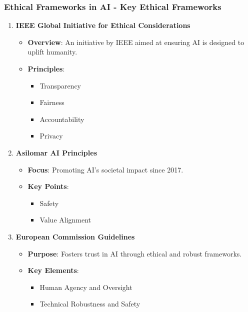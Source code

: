 \documentclass[aspectratio=169]{beamer}
\begin{document}
\begin{frame}[fragile]
    \frametitle{Ethical Frameworks in AI - Key Ethical Frameworks}
    \begin{enumerate}
        \item \textbf{IEEE Global Initiative for Ethical Considerations}
            \begin{itemize}
                \item \textbf{Overview}: An initiative by IEEE aimed at ensuring AI is designed to uplift humanity.
                \item \textbf{Principles}:
                    \begin{itemize}
                        \item Transparency
                        \item Fairness
                        \item Accountability
                        \item Privacy
                    \end{itemize}
            \end{itemize}
        
        \item \textbf{Asilomar AI Principles}
            \begin{itemize}
                \item \textbf{Focus}: Promoting AI's societal impact since 2017.
                \item \textbf{Key Points}:
                    \begin{itemize}
                        \item Safety
                        \item Value Alignment
                    \end{itemize}
            \end{itemize}
        
        \item \textbf{European Commission Guidelines}
            \begin{itemize}
                \item \textbf{Purpose}: Fosters trust in AI through ethical and robust frameworks.
                \item \textbf{Key Elements}:
                    \begin{itemize}
                        \item Human Agency and Oversight
                        \item Technical Robustness and Safety
                    \end{itemize}
            \end{itemize}
    \end{enumerate}
\end{frame}
\end{document}
